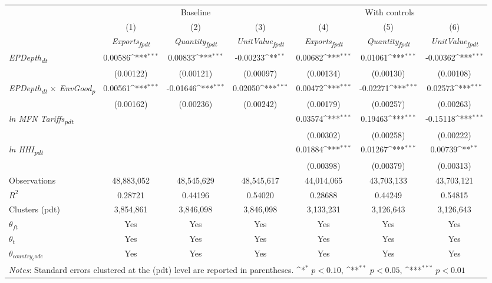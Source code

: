 {
\def\sym#1{\ifmmode^{#1}\else\(^{#1}\)\fi}
\begin{tabular}{l*{6}{c}}
\toprule
&\multicolumn{3}{c}{Baseline}&\multicolumn{3}{c}{With controls}\\\cmidrule(lr){2-4}\cmidrule(lr){5-7}
&(1)&(2)&(3)&(4)&(5)&(6)\\
&\textit{Exports\textsubscript{fpdt}}&\textit{Quantity\textsubscript{fpdt}}&\textit{UnitValue\textsubscript{fpdt}}&\textit{Exports\textsubscript{fpdt}}&\textit{Quantity\textsubscript{fpdt}}&\textit{UnitValue\textsubscript{fpdt}}\\
\midrule
\textit{EPDepth\textsubscript{dt}} & 0.00586\sym{***} & 0.00833\sym{***} & -0.00233\sym{**} & 0.00682\sym{***} & 0.01061\sym{***} & -0.00362\sym{***}\\
 & (0.00122) & (0.00121) & (0.00097) & (0.00134) & (0.00130) & (0.00108)\\
\addlinespace
\textit{EPDepth\textsubscript{dt} $\times$ EnvGood\textsubscript{p}} & 0.00561\sym{***} & -0.01646\sym{***} & 0.02050\sym{***} & 0.00472\sym{***} & -0.02271\sym{***} & 0.02573\sym{***}\\
 & (0.00162) & (0.00236) & (0.00242) & (0.00179) & (0.00257) & (0.00263)\\
\addlinespace
\textit{ln MFN Tariffs\textsubscript{pdt}} &  &  &  & 0.03574\sym{***} & 0.19463\sym{***} & -0.15118\sym{***}\\
 &  &  &  & (0.00302) & (0.00258) & (0.00222)\\
\addlinespace
\textit{ln HHI\textsubscript{pdt}} &  &  &  & 0.01884\sym{***} & 0.01267\sym{***} & 0.00739\sym{**}\\
 &  &  &  & (0.00398) & (0.00379) & (0.00313)\\
\midrule
Observations & 48,883,052 & 48,545,629 & 48,545,617 & 44,014,065 & 43,703,133 & 43,703,121\\
$R^{2}$ & 0.28721 & 0.44196 & 0.54020 & 0.28688 & 0.44249 & 0.54815\\
Clusters (pdt) & 3,854,861 & 3,846,098 & 3,846,098 & 3,133,231 & 3,126,643 & 3,126,643\\
$\theta_{ft}$ & Yes & Yes & Yes & Yes & Yes & Yes\\
$\theta_{t}$ & Yes & Yes & Yes & Yes & Yes & Yes\\
$\theta_{country_code}$ & Yes & Yes & Yes & Yes & Yes & Yes\\
\bottomrule
\multicolumn{7}{l}{\footnotesize \textit{Notes}: Standard errors clustered at the (pdt) level are reported in parentheses. \sym{*} \(p<0.10\), \sym{**} \(p<0.05\), \sym{***} \(p<0.01\)}\\
\end{tabular}
}
